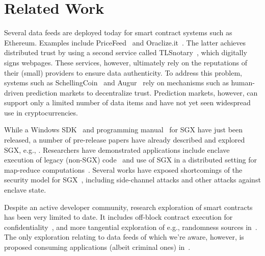 \section{Related Work}

Several data feeds are deployed today for smart contract systems such as Ethereum. Examples include PriceFeed~\cite{PriceFeed:2016} and Oraclize.it~\cite{Oraclize:2016}. The latter achieves distributed trust by using a second service called TLSnotary~\cite{TLSnotary}, which digitally signs webpages. These services, however, ultimately rely on the reputations of their (small) providers to ensure data authenticity.  To address this problem, systems such as SchellingCoin~\cite{schellingcoin} and Augur~\cite{augur} rely on mechanisms such as human-driven prediction markets to decentralize trust. Prediction markets, however, can support only a limited number of data items and have not yet seen widespread use in cryptocurrencies. 

While a Windows SDK~\cite{sgxsdk} and programming manual~\cite{sgxmanual} for SGX have just been released, a number of pre-release papers have already described and explored SGX, e.g., \cite{Baumann:2015:SAU:2818727.2799647,7163017,7163052,anati2013innovative,McKeen:2013jv,Phegade:2013km}. Researchers have demonstrated applications include enclave execution of legacy (non-SGX) code~\cite{Haven} and use of SGX in a distributed setting for map-reduce computations~\cite{VC3}. Several works have exposed shortcomings of the security model for SGX~\cite{sgxexplained,sgxsok,shihardwaretalk}, including side-channel attacks and other attacks against enclave state. 

Despite an active developer community, research exploration of smart contracts has been very limited to date. It includes off-block contract execution for confidentiality~\cite{hawk}, and more tangential exploration of e.g., randomness sources in~\cite{bonneau2015bitcoin}. The only exploration relating to data feeds of which we're aware, however, is proposed consuming applications (albeit criminal ones) in~\cite{}.
